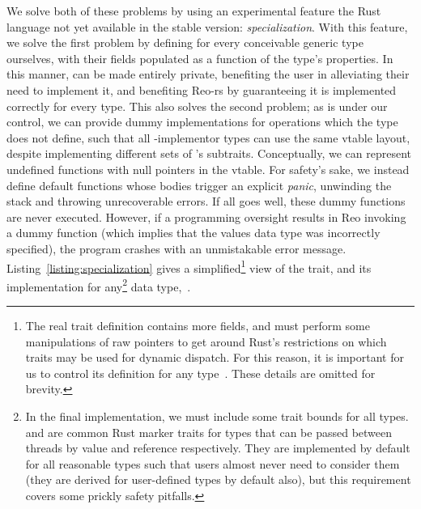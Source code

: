 We solve both of these problems by using an experimental feature the Rust language not yet available in the stable version: \textit{specialization}. With this feature, we solve the first problem by defining  for every conceivable generic type ourselves, with their fields populated as a function of the type's properties. In this manner,  can be made entirely private, benefiting the user in alleviating their need to implement it, and benefiting Reo-rs by guaranteeing it is implemented correctly for every type. This also solves the second problem; as  is under our control, we can provide dummy implementations for operations which the type does not define, such that all -implementor types can use the same vtable layout, despite implementing different sets of 's subtraits. Conceptually, we can represent undefined functions with null pointers in the vtable. For safety's sake, we instead define default functions whose bodies trigger an explicit \textit{panic}, unwinding the stack and throwing unrecoverable errors. If all goes well, these dummy functions are never executed. However, if a programming oversight results in Reo invoking a dummy function (which implies that the values data type was incorrectly specified), the program crashes with an unmistakable error message. Listing~\ref{listing:specialization} gives a simplified\footnote{The real trait definition contains more fields, and must perform some manipulations of raw pointers to get around Rust's restrictions on which traits may be used for dynamic dispatch. For this reason, it is important for us to control its definition for any type~. These details are omitted for brevity.} view of the  trait, and its implementation for any\footnote{In the final implementation, we must include some trait bounds for all  types.  and  are common Rust marker traits for types that can be passed between threads by value and reference respectively. They are implemented by default for all reasonable types such that users almost never need to consider them~\cite{klabnik2018rust} (they are derived for user-defined types by default also), but this requirement covers some prickly safety pitfalls.} data type,~.

